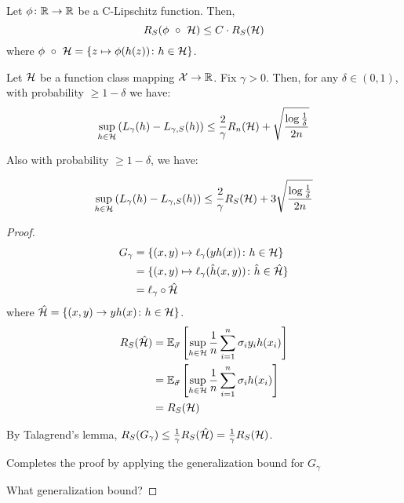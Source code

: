 \begin{lemma}
    Let \(\phi \colon \mathbb{R} \to \mathbb{R}\) be a C-Lipschitz function. Then, 
    \[
        R_S (\phi \ \circ \ \Hcal) \leq C \cdot R_S(\Hcal)  
    \]
    where \(\phi \ \circ \ \mathcal{H} = \{z \mapsto \phi(h(z)) \colon h \in \mathcal{H}\}\).  
\end{lemma}

\begin{theorem}
    Let \(\mathcal{H}\) be a function class mapping \(\mathcal{X} \to \mathbb{R}\). Fix \(\gamma > 0\). Then, 
    for any \(\delta \in (0,1)\), with probability \(\geq 1 - \delta\) we have: 
    \[
        \sup_{h \in \mathcal{H}} \left( L_\gamma (h) - L_{\gamma, S} (h) \right)  
        \leq \frac{2}{\gamma} R_n(\mathcal{H}) + \sqrt{ \frac{\log \frac{1}{\delta}}{2n} }  
    \]

    Also with probability \(\geq 1 - \delta\), we have: 

    \[
        \sup_{h \in \mathcal{H}} \left( L_\gamma (h) - L_{\gamma, S} (h) \right)  
        \leq \frac{2}{\gamma} R_S(\mathcal{H}) + 3\sqrt{ \frac{\log \frac{1}{\delta}}{2n} }  
    \]
\end{theorem}


\begin{proof}
    \begin{align*}
        G_\gamma &= \{ (x,y) \mapsto \ell_\gamma (yh(x)) \colon h \in \mathcal{H} \} \\ 
                 &= \{ (x,y) \mapsto \ell_\gamma (\hat{h}(x, y)) \colon \hat{h} \in \hat{\mathcal{H}}  \} \\ 
                 &= \ell_\gamma \circ \hat{\mathcal{H}}
    \end{align*}
    where \(\hat{\mathcal{H}} = \{ (x,y) \to yh(x) \colon h \in \mathcal{H} \}\). 
    \begin{align*}
        R_S(\hat{\mathcal{H}}) &= \mathbb{E}_{\vec{\sigma}} \left[ \sup_{h \in \mathcal{H}} \frac{1}{n} \sum_{i=1}^n 
        \sigma_i y_i h(x_i) \right] \\ 
                         &= \mathbb{E}_{\vec{\sigma}} \left[ \sup_{h \in \mathcal{H}} \frac{1}{n} \sum_{i=1}^n 
                         \sigma_i h(x_i) \right] \\ 
                         &= R_S (\mathcal{H})
    \end{align*}

    By Talagrend's lemma, \(R_S(G_\gamma) \leq \frac{1}{\gamma} R_S(\hat{\mathcal{H}}) = \frac{1}{\gamma}
    R_S(\mathcal{H})\). 

    Completes the proof by applying the generalization bound for \(G_\gamma\) 
    

    \color{red} What generalization bound?
\end{proof}


